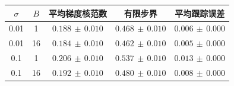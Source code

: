 \begin{tabular}{ccccc}\toprule
$\sigma$ & $B$ & 平均梯度核范数 & 有限步界 & 平均跟踪误差 \\ \midrule
0.01 & 1 & $0.188\,\pm\,0.010$ & $0.468\,\pm\,0.010$ & $0.006\,\pm\,0.000$ \\
0.01 & 16 & $0.184\,\pm\,0.010$ & $0.462\,\pm\,0.010$ & $0.005\,\pm\,0.000$ \\
0.1 & 1 & $0.206\,\pm\,0.010$ & $0.537\,\pm\,0.010$ & $0.013\,\pm\,0.000$ \\
0.1 & 16 & $0.192\,\pm\,0.010$ & $0.480\,\pm\,0.010$ & $0.008\,\pm\,0.000$ \\
\bottomrule\end{tabular}
